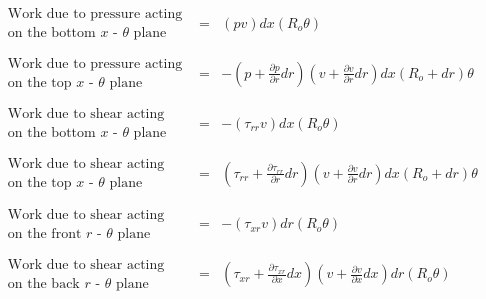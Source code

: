 \begin{displaymath}
	\begin{array}{ccc}
	   \begin{array}{c}
		\textrm{Work due to pressure acting} \\ \textrm{on the bottom $x$ - $\theta$ plane}
	   \end{array} & = &
	(pv)dx(R_o \theta)
	\\ & & \\
	   \begin{array}{c}
		\textrm{Work due to pressure acting} \\ \textrm{on the top $x$ - $\theta$ plane}
	   \end{array} & = &
	-(p + \frac{\partial p}{\partial r}dr)(v + \frac{\partial v}{\partial r}dr)dx(R_o + dr) \theta
	\\ & & \\
	   \begin{array}{c}
		\textrm{Work due to shear acting} \\ \textrm{on the bottom $x$ - $\theta$ plane}
	   \end{array} & = &
	-(\tau_{rr}v)dx(R_o \theta)
	\\ & & \\
	   \begin{array}{c}
		\textrm{Work due to shear acting} \\ \textrm{on the top $x$ - $\theta$ plane}
	   \end{array} & = &
	(\tau_{rr} + \frac{\partial \tau_{rr}}{\partial r}dr)(v + \frac{\partial v}{\partial r}dr)dx(R_o + dr) \theta
	\\ & & \\
	   \begin{array}{c}
		\textrm{Work due to shear acting} \\ \textrm{on the front $r$ - $\theta$ plane}
	   \end{array} & = &
	-(\tau_{xr}v)dr(R_o \theta)
	\\ & & \\
	   \begin{array}{c}
		\textrm{Work due to shear acting} \\ \textrm{on the back $r$ - $\theta$ plane}
	   \end{array} & = &
	(\tau_{xr} + \frac{\partial \tau_{xr}}{\partial x}dx)(v + \frac{\partial v}{\partial x}dx)dr(R_o \theta)
	\end{array}
\end{displaymath}


